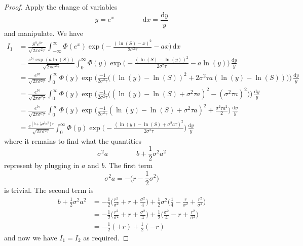 \documentclass[12pt]{article}
\theoremstyle{definition}
\theoremstyle{remark}
\begin{document}
\begin{proof}
	Apply the change of variables
	$$
	y = e^x
	\qquad\qquad
	\mathrm{d}x = \frac{\mathrm{d}y}{y}
	$$
	and manipulate. We have
	\begin{align*}
		I_1
		&= \frac{S^a e^{b\tau}}{\sqrt{2\pi \sigma^2 \tau}} \int_{-\infty}^{\infty} \Phi(e^x) \exp \Big( -\frac{(\ln (S)-x)^2}{2\sigma^2 \tau} - ax \Big) \,\mathrm{d}x \\
		&= \frac{e^{b\tau} \exp(a\ln (S))}{\sqrt{2\pi \sigma^2 \tau}} \int_{0}^{\infty} \Phi(y) \exp \Big( -\frac{(\ln (S)- \ln (y))^2}{2\sigma^2 \tau} - a\ln (y) \Big) \,\frac{\mathrm{d}y}{y} \\
		&= \frac{e^{b\tau}}{\sqrt{2\pi \sigma^2 \tau}} \int_{0}^{\infty} \Phi(y) \exp \Big( \frac{-1}{2\sigma^2\tau} \big( (\ln (y)- \ln (S))^2 + 2\sigma^2\tau a(\ln (y) - \ln (S)) \big) \Big) \,\frac{\mathrm{d}y}{y} \\
		&= \frac{e^{b\tau}}{\sqrt{2\pi \sigma^2 \tau}} \int_{0}^{\infty} \Phi(y) \exp \Big( \frac{-1}{2\sigma^2\tau} \big( (\ln (y)- \ln (S) + \sigma^2\tau a)^2 - (\sigma^2\tau a)^2 \big) \Big) \,\frac{\mathrm{d}y}{y} \\
		&= \frac{e^{b\tau}}{\sqrt{2\pi \sigma^2 \tau}} \int_{0}^{\infty} \Phi(y) \exp \Big( \frac{-1}{2\sigma^2\tau} (\ln (y)- \ln (S) + \sigma^2\tau a)^2 + \frac{\sigma^2\tau a^2}{2} \Big) \,\frac{\mathrm{d}y}{y} \\
		&= \frac{e^{(b + \tfrac12 \sigma^2 a^2) \tau}}{\sqrt{2\pi \sigma^2 \tau}} \int_{0}^{\infty} \Phi(y) \exp \Big( - \frac{(\ln (y)- \ln (S) + \sigma^2 a\tau)^2}{2\sigma^2\tau} \Big) \,\frac{\mathrm{d}y}{y}
	\end{align*}
	where it remains to find what the quantities
	$$
	\sigma^2 a
	\qquad\qquad
	b+\frac{1}{2}\sigma^2a^2
	$$
	represent by plugging in $a$ and $b$. The first term
	$$
	\sigma^2 a = - \Big( r - \frac{1}{2} \sigma^2 \Big)
	$$
	is trivial. The second term is
	\begin{align*}
		b+\frac{1}{2}\sigma^2a^2
		&= -\frac{1}{2} \Big( \frac{r^2}{\sigma^2} + r + \frac{\sigma^2}{4} \Big) + \frac{1}{2}\sigma^2 \Big( \frac{1}{4} - \frac{r}{\sigma^2} + \frac{r^2}{\sigma^4} \Big) \\
		&= -\frac{1}{2} \Big( \frac{r^2}{\sigma^2} + r + \frac{\sigma^2}{4} \Big) + \frac{1}{2} \Big( \frac{\sigma^2}{4} - r + \frac{r^2}{\sigma^2} \Big) \\
		&= -\frac{1}{2}(+r) + \frac{1}{2}(-r)
	\end{align*}
	and now we have $I_1=I_2$ as required.
\end{proof}
\end{document}
